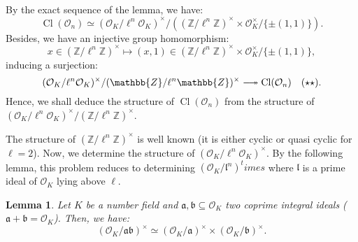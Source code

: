 \documentclass[a4paper,10pt,notitlepage]{report}
\theoremstyle{definition}
\theoremstyle{plain}
\newtheorem{Lemma}[Definition]{Lemma}
\theoremstyle{definition}
\newcommand{\Z}{\mathbb{Z}}
\newcommand{\mO}{\mathcal{O}}
\renewcommand{\(}{\left(}
\renewcommand{\)}{\right)}
\newcommand{\mf}[1]{\mathfrak{#1}}
\DeclareMathOperator{\Cl}{Cl}
\begin{document}
By the exact sequence of the lemma, we have:
\[\Cl(\mO_n)\simeq (\mO_K/\ell^n\mO_K)^\times/((\Z/\ell^n\Z)^\times\times \mO_K^\times/\{\pm(1,1)\}).\]
Besides, we have an injective group homomorphism:
\[x\in(\Z/\ell^n\Z)^\times\longmapsto (x,1)\in (\Z/\ell^n\Z)^\times\times \mO_K^\times/\{\pm(1,1)\},\]
inducing a surjection:
\[(\mO_K/\ell^n\mO_K)^\times/(\Z/\ell^n\Z)^\times\relbar\joinrel\twoheadrightarrow \Cl(\mO_n) \quad (\star\star).\]
Hence, we shall deduce the structure of $\Cl(\mO_n)$ from the structure of $(\mO_K/\ell^n\mO_K)^\times/(\Z/\ell^n\Z)^\times$.

The structure of $(\Z/\ell^n\Z)^\times$ is well known (it is either cyclic or quasi cyclic for $\ell=2$). Now, we determine the structure of $(\mO_K/\ell^n\mO_K)^\times$. By the following lemma, this problem reduces to determining $(\mO_K/\mf{l}^n)^times$ where $\mf{l}$ is a prime ideal of $\mO_K$ lying above $\ell$.

\begin{Lemma}\label{Lemma 14}
Let $K$ be a number field and $\mf{a}, \mf{b}\subseteq \mO_K$ two coprime integral ideals ($\mf{a}+\mf{b}=\mO_K$). Then, we have:
\[(\mO_K/\mf{a}\mf{b})^\times\simeq(\mO_K/\mf{a})^\times\times(\mO_K/\mf{b})^\times.\] 
\end{Lemma}
\end{document}
